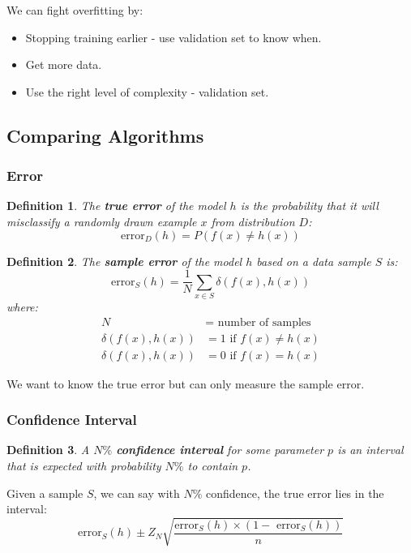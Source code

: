 \documentclass[11pt]{article}
\newtheorem{defn}{Definition}
\begin{document}
We can fight overfitting by:
\begin{itemize}
  \item Stopping training earlier - use validation set to know when.
  \item Get more data.
  \item Use the right level of complexity - validation set.
\end{itemize}

\subsection{Comparing Algorithms}
\subsubsection{Error}
\begin{defn}
  The \textbf{true error} of the model $h$ is the probability that it will misclassify a randomly drawn example $x$ from distribution $D$:
  \[
    \text{error}_D(h) = P(f(x) \neq h(x)) 
  \]
\end{defn}

\begin{defn}
  The \textbf{sample error} of the model $h$ based on a data sample $S$ is:
  \[
    \text{error}_S(h) = \frac{1}{N} \sum_{x \in S} \delta(f(x), h(x))
  \]
  where:
  \begin{align*}
    N &= \text{ number of samples} \\
    \delta(f(x), h(x)) &= 1 \text{ if } f(x) \neq h(x) \\
    \delta(f(x), h(x)) &= 0 \text{ if } f(x) = h(x)
  \end{align*}
\end{defn}

We want to know the true error but can only measure the sample error.

\subsubsection{Confidence Interval}
\begin{defn}
  A $N\%$ \textbf{confidence interval} for some parameter $p$ is an interval that is expected with probability $N\%$ to contain $p$.
\end{defn}

Given a sample $S$, we can say with $N\%$ confidence, the true error lies in the interval:
\[
\text{error}_S(h) \pm Z_N \sqrt{\frac{\text{error}_S(h) \times (1 - \text{ error}_S(h))}{n}}
\]
\end{document}
